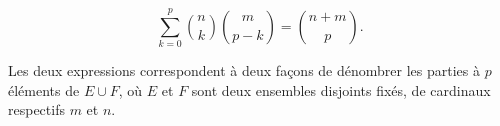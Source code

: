 \begin{prop}{}
    $$\sum_{k = 0}^{p} \binom{n}{k} \binom{m}{p-k} = \binom{n + m}{p}.$$
\end{prop}

Les deux expressions correspondent à deux façons de dénombrer les parties à $p$ éléments de $E \cup F$, où $E$ et $F$ sont deux ensembles disjoints fixés, de cardinaux respectifs $m$ et $n$. 
